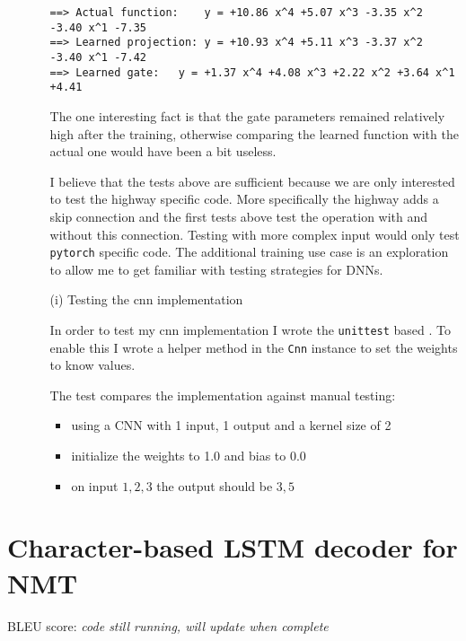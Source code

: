 \documentclass{article}
\begin{document}
\begin{enumerate}
\begin{itemize}
\begin{verbatim}
==> Actual function:	y = +10.86 x^4 +5.07 x^3 -3.35 x^2 -3.40 x^1 -7.35
==> Learned projection:	y = +10.93 x^4 +5.11 x^3 -3.37 x^2 -3.40 x^1 -7.42
==> Learned gate:	y = +1.37 x^4 +4.08 x^3 +2.22 x^2 +3.64 x^1 +4.41
\end{verbatim}

The one interesting fact is that the gate parameters remained relatively high after the training, otherwise comparing the learned function with the actual one would have been a bit useless.

I believe that the tests above are sufficient because we are only interested to test the highway specific code. More specifically the highway adds a skip connection and the first tests above test the operation with and without this connection. Testing with more complex input would only test \texttt{pytorch} specific code. The additional training use case is an exploration to allow me to get familiar with testing strategies for DNNs.

\clearpage

\item[(i)]{Testing the cnn implementation}

In order to test my cnn implementation I wrote the \texttt{unittest} based . To enable this I wrote a helper method in the \texttt{Cnn} instance to set the weights to know values.

The test compares the implementation against manual testing: 

\begin{itemize}

\item using a CNN with 1 input, 1 output and a kernel size of 2
\item initialize the weights to 1.0 and bias to 0.0
\item on input $1, 2, 3$ the output should be $3,5$
\end{itemize}

\end{itemize}


\end{enumerate}

\clearpage


\section{Character-based LSTM decoder for NMT}

BLEU score: \textit{code still running, will update when complete}
\end{document}
